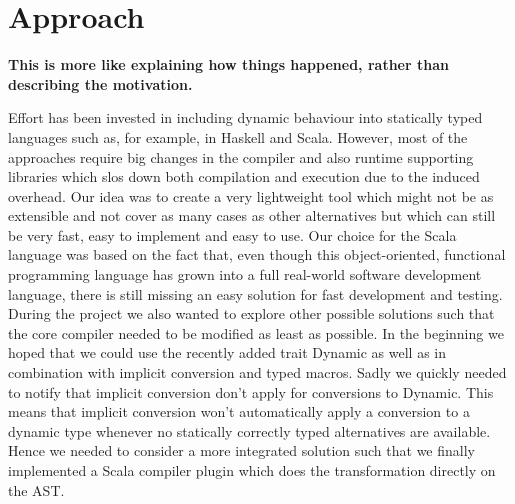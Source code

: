  \section{Approach}

\textbf{This is more like explaining how things happened, rather than describing the motivation.}

 Effort has been invested in including dynamic behaviour into statically typed languages such as, for example, in Haskell and Scala. However, most of the approaches require big changes in the compiler and also runtime supporting libraries which slos down both compilation and execution due to the induced overhead. Our idea was to create a very lightweight tool which might not be as extensible and not cover as many cases as other alternatives but which can still be very fast, easy to implement and easy to use. Our choice for the Scala language was based on the fact that, even though this object-oriented, functional programming language has grown into a full real-world software development language, there is still missing an easy solution for fast development and testing. During the project we also wanted to explore other possible solutions such that the core compiler needed to be modified as least as possible. In the beginning we hoped that we could use the recently added trait {\ttfamily Dynamic} as well as in combination with implicit conversion and typed macros. Sadly we quickly needed to notify that implicit conversion don't apply for conversions to Dynamic. This means that implicit conversion won't automatically apply a conversion to a dynamic type whenever no statically correctly typed alternatives are available. Hence we needed to consider a more integrated solution such that we finally implemented a Scala compiler plugin which does the transformation directly on the AST.
